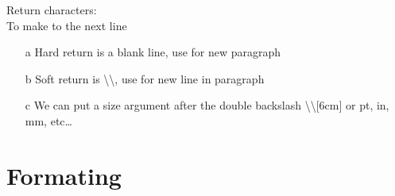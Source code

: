 \documentclass[12pt, a4paper]{article}
\begin{document}
Return characters:\\
To make to the next line
\begin{itemize}
    \item[a]Hard return is a blank line, use for new paragraph
    \item[b]Soft return is \textbackslash\textbackslash, use for new line in paragraph
    \item[c]We can put a size argument after the double backslash \textbackslash\textbackslash$[$6cm$]$ or pt, in, mm, etc\ldots
\end{itemize}

\section{Formating}
%
%
%
%
%
%
%
%
%
\end{document}

